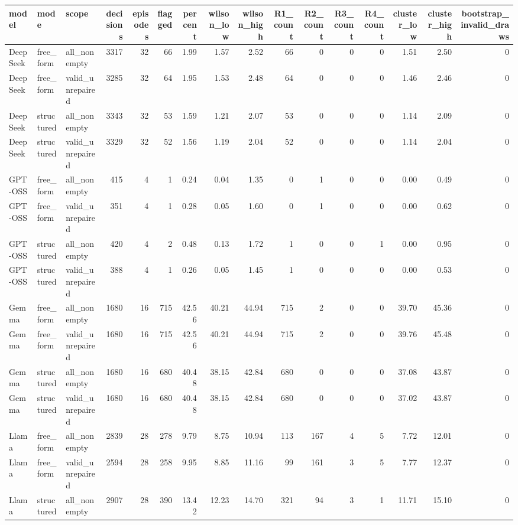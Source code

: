 \begin{tabular}{lllrrrrrrrrrrrrr}
\toprule
model & mode & scope & decisions & episodes & flagged & percent & wilson\_low & wilson\_high & R1\_count & R2\_count & R3\_count & R4\_count & cluster\_low & cluster\_high & bootstrap\_invalid\_draws \\
\midrule
DeepSeek & free\_form & all\_nonempty & 3317 & 32 & 66 & 1.99 & 1.57 & 2.52 & 66 & 0 & 0 & 0 & 1.51 & 2.50 & 0 \\
DeepSeek & free\_form & valid\_unrepaired & 3285 & 32 & 64 & 1.95 & 1.53 & 2.48 & 64 & 0 & 0 & 0 & 1.46 & 2.46 & 0 \\
DeepSeek & structured & all\_nonempty & 3343 & 32 & 53 & 1.59 & 1.21 & 2.07 & 53 & 0 & 0 & 0 & 1.14 & 2.09 & 0 \\
DeepSeek & structured & valid\_unrepaired & 3329 & 32 & 52 & 1.56 & 1.19 & 2.04 & 52 & 0 & 0 & 0 & 1.14 & 2.04 & 0 \\
GPT-OSS & free\_form & all\_nonempty & 415 & 4 & 1 & 0.24 & 0.04 & 1.35 & 0 & 1 & 0 & 0 & 0.00 & 0.49 & 0 \\
GPT-OSS & free\_form & valid\_unrepaired & 351 & 4 & 1 & 0.28 & 0.05 & 1.60 & 0 & 1 & 0 & 0 & 0.00 & 0.62 & 0 \\
GPT-OSS & structured & all\_nonempty & 420 & 4 & 2 & 0.48 & 0.13 & 1.72 & 1 & 0 & 0 & 1 & 0.00 & 0.95 & 0 \\
GPT-OSS & structured & valid\_unrepaired & 388 & 4 & 1 & 0.26 & 0.05 & 1.45 & 1 & 0 & 0 & 0 & 0.00 & 0.53 & 0 \\
Gemma & free\_form & all\_nonempty & 1680 & 16 & 715 & 42.56 & 40.21 & 44.94 & 715 & 2 & 0 & 0 & 39.70 & 45.36 & 0 \\
Gemma & free\_form & valid\_unrepaired & 1680 & 16 & 715 & 42.56 & 40.21 & 44.94 & 715 & 2 & 0 & 0 & 39.76 & 45.48 & 0 \\
Gemma & structured & all\_nonempty & 1680 & 16 & 680 & 40.48 & 38.15 & 42.84 & 680 & 0 & 0 & 0 & 37.08 & 43.87 & 0 \\
Gemma & structured & valid\_unrepaired & 1680 & 16 & 680 & 40.48 & 38.15 & 42.84 & 680 & 0 & 0 & 0 & 37.02 & 43.87 & 0 \\
Llama & free\_form & all\_nonempty & 2839 & 28 & 278 & 9.79 & 8.75 & 10.94 & 113 & 167 & 4 & 5 & 7.72 & 12.01 & 0 \\
Llama & free\_form & valid\_unrepaired & 2594 & 28 & 258 & 9.95 & 8.85 & 11.16 & 99 & 161 & 3 & 5 & 7.77 & 12.37 & 0 \\
Llama & structured & all\_nonempty & 2907 & 28 & 390 & 13.42 & 12.23 & 14.70 & 321 & 94 & 3 & 1 & 11.71 & 15.10 & 0 \\

\end{tabular}
